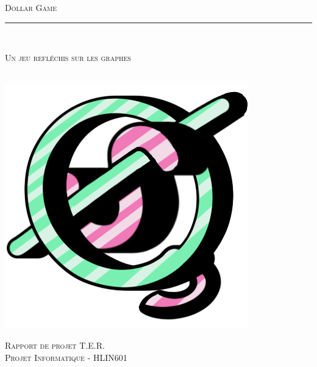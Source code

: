 \documentclass[twoside]{report}
\begin{document}
\begin{titlepage}
\Montserrat

\begin{center}
\textsc{\Huge{Dollar Game}}\\

\vspace*{0.3cm}
\rule{2cm}{0.1pt}\\
\vspace*{0.3cm}

\textsc{\LARGE{Un jeu refléchis sur les graphes\\}}

\vspace{0.8cm}\\
\vspace{0.2cm}
\includegraphics[scale=1.5]{DGLogo.png}\\
\vspace{0.2cm}

\vspace{1cm}
\textsc{\Large{Rapport de projet T.E.R.}}\\
\vspace{0.2cm}
\textsc{\Large{Projet Informatique - HLIN601}} 
\end{center}


\end{titlepage}
\end{document}
